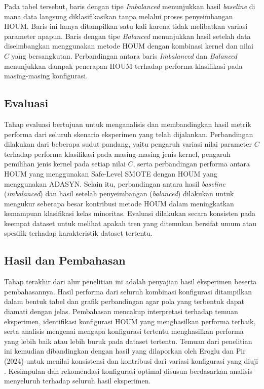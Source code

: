 Pada tabel tersebut, baris dengan tipe \textit{Imbalanced} menunjukkan hasil \textit{baseline} di mana data langsung diklasifikasikan tanpa melalui proses penyeimbangan HOUM. Baris ini hanya ditampilkan satu kali karena tidak melibatkan variasi parameter apapun. Baris dengan tipe \textit{Balanced} menunjukkan hasil setelah data diseimbangkan menggunakan metode HOUM dengan kombinasi kernel dan nilai $C$ yang bersangkutan. Perbandingan antara baris \textit{Imbalanced} dan \textit{Balanced} menunjukkan dampak penerapan HOUM terhadap performa klasifikasi pada masing-masing konfigurasi.

\subsection{Evaluasi} \label{III.Evaluasi}
Tahap evaluasi bertujuan untuk menganalisis dan membandingkan hasil metrik performa dari seluruh skenario eksperimen yang telah dijalankan. Perbandingan dilakukan dari beberapa sudut pandang, yaitu pengaruh variasi nilai parameter $C$ terhadap performa klasifikasi pada masing-masing jenis kernel, pengaruh pemilihan jenis kernel pada setiap nilai $C$, serta perbandingan performa antara HOUM yang menggunakan Safe-Level SMOTE dengan HOUM yang menggunakan ADASYN. Selain itu, perbandingan antara hasil \textit{baseline} (\textit{imbalanced}) dan hasil setelah penyeimbangan (\textit{balanced}) dilakukan untuk mengukur seberapa besar kontribusi metode HOUM dalam meningkatkan kemampuan klasifikasi kelas minoritas. Evaluasi dilakukan secara konsisten pada keempat dataset untuk melihat apakah tren yang ditemukan bersifat umum atau spesifik terhadap karakteristik dataset tertentu.

\subsection{Hasil dan Pembahasan} \label{III.HasilPembahasan}
Tahap terakhir dari alur penelitian ini adalah penyajian hasil eksperimen beserta pembahasannya. Hasil performa dari seluruh kombinasi konfigurasi ditampilkan dalam bentuk tabel dan grafik perbandingan agar pola yang terbentuk dapat diamati dengan jelas. Pembahasan mencakup interpretasi terhadap temuan eksperimen, identifikasi konfigurasi HOUM yang menghasilkan performa terbaik, serta analisis mengenai mengapa konfigurasi tertentu menghasilkan performa yang lebih baik atau lebih buruk pada dataset tertentu. Temuan dari penelitian ini kemudian dibandingkan dengan hasil yang dilaporkan oleh Eroglu dan Pir (2024) untuk menilai konsistensi dan kontribusi dari variasi konfigurasi yang diuji \cite{Eroglu2024HOUM}. Kesimpulan dan rekomendasi konfigurasi optimal disusun berdasarkan analisis menyeluruh terhadap seluruh hasil eksperimen.

